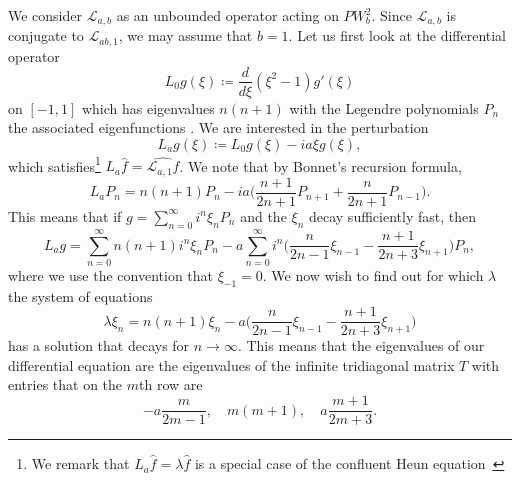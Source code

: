 \documentclass[12pt]{amsart}
\theoremstyle{plain}
\numberwithin{equation}{section}
\theoremstyle{definition}
\begin{document}
We consider $\mathcal{L}_{a,b}$ as an unbounded operator acting on $PW^2_b$. Since $\mathcal{L}_{a,b}$ is conjugate to $\mathcal{L}_{ab,1}$, we may assume that $b=1$. Let us first look at the differential operator
\[ L_0 g(\xi)\coloneqq \frac{d}{d\xi}(\xi^2-1)g'(\xi) \]
on $[-1,1]$ which has eigenvalues $ n(n+1)$ with the Legendre polynomials $P_n$ the associated eigenfunctions . We are interested in the perturbation
	\[ L_a g(\xi)\coloneqq L_0g(\xi)-ia\xi g(\xi),\]
which satisfies\footnote{We remark that $L_{a}\widehat{f}=\lambda \widehat{f}$ is a special case of the confluent Heun equation~\cite[Sec. 31.12]{NIST:DLMF}} $L_a\widehat{f} = \widehat{\mathcal{L}_{a,1}f}$.
We note that by Bonnet's recursion formula,
\[ L_a P_n =n(n+1) P_n-ia\big(\frac{n+1}{2n+1} P_{n+1}+\frac{n}{2n+1}P_{n-1}\big). \]
This means that if  $g=\sum_{n=0}^\infty i^n\xi_n P_n$ and the $\xi_n$ decay sufficiently fast, then
\[ L_a g= \sum_{n=0}^\infty n(n+1) i^n\xi_n P_n - a \sum_{n=0}^\infty i^n \big(\frac{n}{2n-1}\xi_{n-1}-\frac{n+1}{2n+3}\xi_{n+1}\big) P_n , \]
where we use the convention that $\xi_{-1}=0$. We now wish to find out for which $\lambda$ the system of equations
	\begin{equation} \label{eq:tridiag}
	\lambda \xi_n = n(n+1) \xi_n - a \big(\frac{n}{2n-1}\xi_{n-1}-\frac{n+1}{2n+3}\xi_{n+1}\big) 
	\end{equation}
has a solution that decays for $n\to\infty$. This means that the eigenvalues of our differential equation are the eigenvalues of the infinite tridiagonal matrix $T$ with entries that on the $m$th row are
	\begin{equation} \label{eq:entries} 
		-a \frac{m}{2m-1}, \quad m(m+1), \quad  a \frac{m+1}{2m+3}.
	\end{equation}
\end{document}
